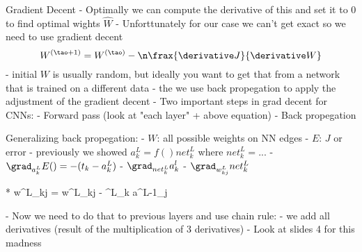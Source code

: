 Gradient Decent
- Optimally we can compute the derivative of this and set it to 0 to find optimal wights $\hat{W}$
- Unforttunately for our case we can't get exact so we need to use gradient decent
\[W^{(\tao + 1)} = W^{(\tao)} - \n \frax{\derivative J}{\derivative W}\]
- initial $W$ is usually random, but ideally you want to get that from a network that is trained on a different data
- the we use back propegation to apply the adjustment of the gradient decent
- Two important steps in grad decent for CNNs:
 - Forward pass (look at "each layer" + above equation)
 - Back propegation

Generalizing back propegation:
- $W$: all possible weights on NN edges
- $E$: $J$ or error
- previously we showed $a^L_k = f()net^L_k$ where $net^L_k = ...$
- $\grad_{a^L_k} E() = - (t_k - a^L_k)$
- $\grad_{net^L_k} a^l_k$
- $\grad_{w^L_{kj}} net^L_k$

* w^L_{kj} = w^L_{kj} - \n\delta^L_k a^{L-1}_j

- Now we need to do that to previous layers and use chain rule:
- we add all derivatives (result of the multiplication of 3 derivatives)
- Look at slides 4 for this madness
